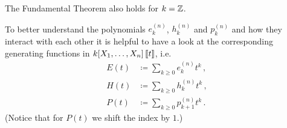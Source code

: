 \begin{remark}
  The Fundamental Theorem also holds for $k = \mathbb{Z}$.
\end{remark}


To better understand the polynomials $e^{(n)}_k$, $h^{(n)}_k$ and $p^{(n)}_k$ and how they interact with each other it is helpful to have a look at the corresponding generating functions in $k[X_1, \dotsc, X_n]\left[\!\left[t\right]\!\right]$, i.e.\
\begin{align*}
              E(t)
  &\coloneqq  \sum_{k \geq 0} e^{(n)}_k t^k \,,
  \\
              H(t)
  &\coloneqq  \sum_{k \geq 0} h^{(n)}_k t^k \,,
  \\
              P(t)
  &\coloneqq  \sum_{k \geq 0} p^{(n)}_{k+1} t^k \,.
\end{align*}
(Notice that for $P(t)$ we shift the index by $1$.)


